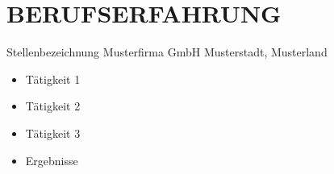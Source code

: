 \section{BERUFSERFAHRUNG}

        {Stellenbezeichnung}
        {Musterfirma GmbH}
        {Musterstadt, Musterland}
        {}   %
        {
        \begin{itemize}
            \item Tätigkeit 1
            \item Tätigkeit 2
            \item Tätigkeit 3
            \item Ergebnisse
        \end{itemize}
        }

